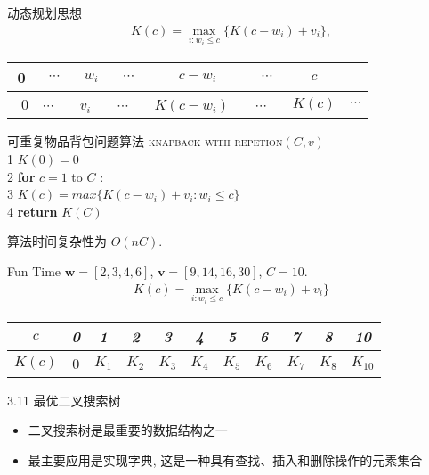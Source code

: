 \documentclass[fontset=fandol,UTF8,fleqn]{beamer}
\begin{document}
\begin{frame}{动态规划思想}
\begin{eqnarray*}
      K(c)=\max\limits_{i:w_i\leq c}\{K(c-w_i)+v_i\},
\end{eqnarray*}
\begin{table}[c]
  \centering
  \begin{tabular}{cccccccc}
  0 & $\cdots$ & $w_i$ & $\cdots$ & $c-w_i$  & $\cdots$ & $c$ \\
\hline
\vline\  0 \vline & $\cdots$ \vline\ & $v_i$ \vline\ & $\cdots$ \vline\  & $K(c-w_i)$
  \vline\ & $\cdots $ \vline\ &   $K(c)$ \vline & $\cdots$ \vline   \\
\hline
  \end{tabular}
\end{table}
\end{frame}

\begin{frame}{可重复物品背包问题算法}
\textsc{knapback-with-repetion}$(C, v)$ \\
1 \quad $K(0) = 0$ \\
2 \quad \textbf{for} $c = 1$ to $C$ : \\
3 \quad \qquad $K(c) = max\{K(c - w_i) + v_i : w_i \leq c\}$ \\
4 \quad \textbf{return} $K(C)$

\vspace*{2cm}
算法时间复杂性为 $O(nC)$.  
\end{frame}

\begin{frame}{Fun Time}
$\mathbf{w}=[2,3,4,6]$, $\mathbf{v}=[9,14,16,30]$, $C=10$.
\begin{eqnarray*}
      K(c)=\max\limits_{i:w_i\leq c}\{K(c-w_i)+v_i\}
\end{eqnarray*}
\begin{table}[c]
  \centering
  \begin{tabular}{c|c|c|c|c|c|c|c|c|c|c}
\hline
 $c$ &  \textit{0} & \textit{1} & \textit{2} & \textit{3} & \textit{4}  & \textit{5} & \textit{6} & \textit{7} & \textit{8} & \textit{10} \\
\hline
$K(c)$ &  0 & $K_1$ & $K_2$ & $K_3$ & $K_4$  & $K_5$ & $K_6$ & $K_7$ & $K_8$ & $K_{10}$ \\
\hline
  \end{tabular}
\end{table}
\end{frame}

\begin{frame}{3.11 最优二叉搜索树}
\begin{itemize}
\item  二叉搜索树是最重要的数据结构之一 
\item 最主要应用是实现字典, 这是一种具有查找、插入和删除操作的元素集合 
\end{itemize}
\end{frame}
\end{document}
